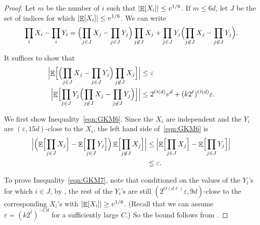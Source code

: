 \documentclass{toc}
\def\eps{\varepsilon}
\def\Blocklength{\ell}
\DeclarePairedDelimiter{\abs}{\lvert}{\rvert}
\DeclareMathOperator*{\E}{\mathbb{E}}                 %
\begin{document}
  \begin{proof}

    Let $m$ be the number of $i$ such that $\abs{\E[X_i]} \le v^{1/6}$.
    If $m \le 6d$, let $J$ be the set of indices for which $\abs{\E[X_i]} \le v^{1/6}$.
    We can write
    \[
      \prod_i X_i - \prod_i Y_i
      = \Bigl( \prod_{j \in J} X_j - \prod_{j \in J} Y_j \Bigr) \prod_{j \not \in J} X_j
      + \prod_{j \in J} Y_j \Bigl( \prod_{j \not \in J} X_j - \prod_{j \not \in J} Y_j \Bigr).
    \]

    It suffices to show that
    \begin{align}
      \Bigl| \E \Bigl[ \Bigl( \prod_{j \in J} X_j - \prod_{j \in J} Y_j \Bigr) \prod_{j \not \in J} X_j \Bigr] \Bigr|
      &\le \eps \label{eqn:GKM6} \\
      \Bigl| \E \Bigl[ \prod_{j \in J} Y_j \Bigl( \prod_{j \not \in J} X_j - \prod_{j \not \in J} Y_j \Bigr) \Bigr] \Bigr|
      &\le 2^{O(d)} v^d + (k 2^\Blocklength)^{O(d)} \eps . \label{eqn:GKM7}
    \end{align}

    We first show Inequality~\eqref{eqn:GKM6}.
    Since the $X_i$ are independent and the $Y_i$ are $(\eps, 15d)$-close to the $X_i$, the left hand side of~\eqref{eqn:GKM6} is
    \begin{align*}
      \Bigl| \Bigl( \E \Bigl[ \prod_{j \in J} X_j \Bigr] - \E \Bigl[ \prod_{j \in J} Y_j \Bigr] \Bigr) \E \Bigl[ \prod_{j \not \in J} X_j \Bigr] \Bigr|
      &\le \Bigl| \E \Bigl[ \prod_{j \in J} X_j \Bigr] - \E \Bigl[ \prod_{j \in J} Y_j \Bigr] \Bigr| \\
      &\le \eps.
    \end{align*}

    To prove Inequality~\eqref{eqn:GKM7}, note that conditioned on the values of the $Y_i$'s for which $i \in J$, by , the rest of the $Y_i$'s are still $(2^{O(d\Blocklength)} \eps, 9d)$-close to the corresponding $X_i$'s with $\abs{\E[X_i]} \ge v^{1/6}$.  (Recall that we can assume $\eps = (k2^\Blocklength)^{-Cd}$ for a sufficiently large $C$.)
    So the bound follows from .

    \medskip


\end{proof}
\end{document}
